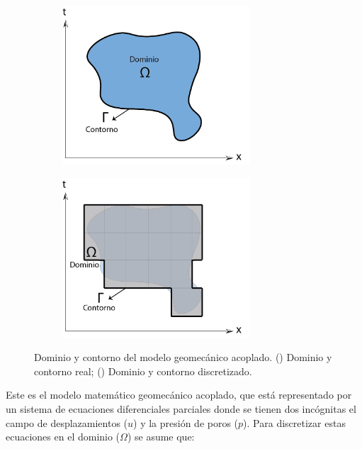 
\begin{figure}[!ht]
\centering
\begin{subfigure}[b]{.45\textwidth}
        \centering
        \includegraphics[width=7cm]{Imagenes/Dominio_Real.png}
        \caption{}
        \label{fig:fig33a}
\end{subfigure}
\hfill
\begin{subfigure}[b]{.45\textwidth}
        \centering
        \includegraphics[width=7cm]{Imagenes/Dominio_FEM.png}
        \caption{}
        \label{fig:fig33b}
\end{subfigure}
\captionsetup{format=plain}
\caption[Dominio y contorno del modelo geomecánico acoplado]{Dominio y contorno del modelo geomecánico acoplado. () Dominio y contorno real; () Dominio y contorno discretizado.} 
\label{fig:fig33}
\end{figure}

Este es el modelo matemático geomecánico acoplado, que está representado por un sistema de ecuaciones diferenciales parciales donde se tienen dos incógnitas el campo de desplazamientos ($u$) y la presión de poros ($p$). Para discretizar estas ecuaciones en el dominio ($\Omega$) se asume que:


